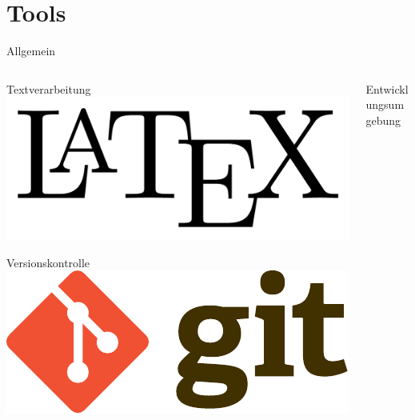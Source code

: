 \documentclass[xcolor=dvipsnames]{beamer}
\begin{document}
    \section{Tools}
    \begin{frame}{Allgemein}
        \begin{columns}
            \begin{column}{0.5\textwidth}
                \begin{block}{Textverarbeitung}
                    \center
                    \includegraphics[width=(\textwidth)]{img/latex.pdf}
                \end{block}
                \begin{block}{Versionskontrolle}
                    \center
                    \includegraphics[width=(\textwidth / 2)]{img/git.pdf}
                \end{block}
            \end{column}
            \begin{column}{0.5\textwidth}
                \begin{block}{Entwicklungsumgebung}

\end{block}
\end{column}
\end{columns}
\end{frame}
\end{document}
